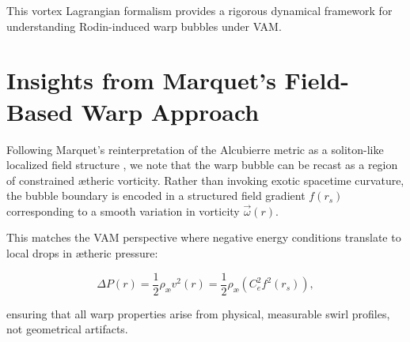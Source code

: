 \documentclass[12pt]{article}
\begin{document}
This vortex Lagrangian formalism provides a rigorous dynamical framework for understanding Rodin-induced warp bubbles under VAM.

\section{Insights from Marquet’s Field-Based Warp Approach}

Following Marquet's reinterpretation of the Alcubierre metric as a soliton-like localized field structure \cite{marquet2012warp}, we note that the warp bubble can be recast as a region of constrained ætheric vorticity. Rather than invoking exotic spacetime curvature, the bubble boundary is encoded in a structured field gradient $f(r_s)$ corresponding to a smooth variation in vorticity $\vec{\omega}(r)$.

This matches the VAM perspective where negative energy conditions translate to local drops in ætheric pressure:

\begin{equation}
    \Delta P(r) = \frac{1}{2} \rho_\text{\ae} v^2(r) = \frac{1}{2} \rho_\text{\ae} (C_e^2 f^2(r_s)),
\end{equation}

ensuring that all warp properties arise from physical, measurable swirl profiles, not geometrical artifacts.



\end{document}
